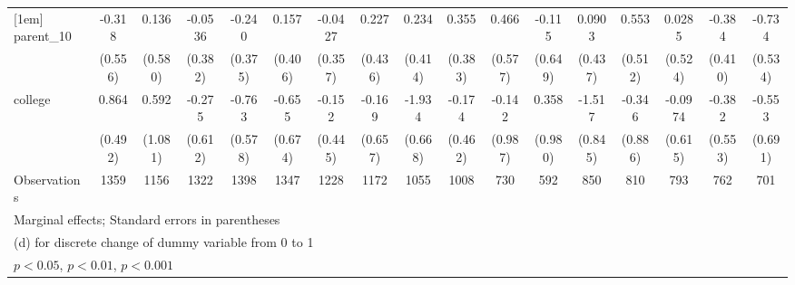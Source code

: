 {\begin{tabular}{l*{16}{c}}
[1em]
parent\_10           &      -0.318         &       0.136         &     -0.0536         &      -0.240         &       0.157         &     -0.0427         &       0.227         &       0.234         &       0.355         &       0.466         &      -0.115         &      0.0903         &       0.553         &      0.0285         &      -0.384         &      -0.734         \\
                    &     (0.556)         &     (0.580)         &     (0.382)         &     (0.375)         &     (0.406)         &     (0.357)         &     (0.436)         &     (0.414)         &     (0.383)         &     (0.577)         &     (0.649)         &     (0.437)         &     (0.512)         &     (0.524)         &     (0.410)         &     (0.534)         \\
[1em]
college             &       0.864         &       0.592         &      -0.275         &      -0.763         &      -0.655         &      -0.152         &      -0.169         &      -1.934\sym{**} &      -0.174         &      -0.142         &       0.358         &      -1.517         &      -0.346         &     -0.0974         &      -0.382         &      -0.553         \\
                    &     (0.492)         &     (1.081)         &     (0.612)         &     (0.578)         &     (0.674)         &     (0.445)         &     (0.657)         &     (0.668)         &     (0.462)         &     (0.987)         &     (0.980)         &     (0.845)         &     (0.886)         &     (0.615)         &     (0.553)         &     (0.691)         \\
\hline
Observations        &        1359         &        1156         &        1322         &        1398         &        1347         &        1228         &        1172         &        1055         &        1008         &         730         &         592         &         850         &         810         &         793         &         762         &         701         \\
\hline\hline
\multicolumn{17}{l}{\footnotesize Marginal effects; Standard errors in parentheses}\\
\multicolumn{17}{l}{\footnotesize  (d) for discrete change of dummy variable from 0 to 1}\\
\multicolumn{17}{l}{\footnotesize \sym{*} \(p<0.05\), \sym{**} \(p<0.01\), \sym{***} \(p<0.001\)}\\
\end{tabular}
}
